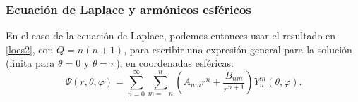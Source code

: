 \subsubsection{Ecuación de Laplace y armónicos esféricos}
En el caso de la ecuación de Laplace, podemos entonces usar el resultado en \eqref{loes2}, con $Q=n(n+1)$, para escribir una expresión general para la solución (finita para $\theta=0$ y $\theta=\pi$), en coordenadas esféricas:
\begin{equation}
\Psi(r,\theta,\varphi)=\sum_{n=0}^\infty\sum_{m=-n}^n\left(A_{nm}r^n+\frac{B_{nm}}{r^{n+1}}\right)Y_n^m(\theta,\varphi).
\end{equation}